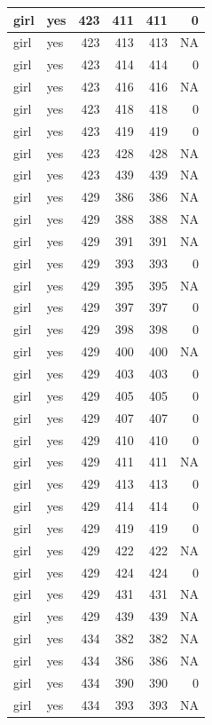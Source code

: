 \documentclass[man]{apa6}
\begin{document}
\begin{tabular}{l|l|r|r|r|r}
\hline
girl & yes & 423 & 411 & 411 & 0\\
\hline
girl & yes & 423 & 413 & 413 & NA\\
\hline
girl & yes & 423 & 414 & 414 & 0\\
\hline
girl & yes & 423 & 416 & 416 & NA\\
\hline
girl & yes & 423 & 418 & 418 & 0\\
\hline
girl & yes & 423 & 419 & 419 & 0\\
\hline
girl & yes & 423 & 428 & 428 & NA\\
\hline
girl & yes & 423 & 439 & 439 & NA\\
\hline
girl & yes & 429 & 386 & 386 & NA\\
\hline
girl & yes & 429 & 388 & 388 & NA\\
\hline
girl & yes & 429 & 391 & 391 & NA\\
\hline
girl & yes & 429 & 393 & 393 & 0\\
\hline
girl & yes & 429 & 395 & 395 & NA\\
\hline
girl & yes & 429 & 397 & 397 & 0\\
\hline
girl & yes & 429 & 398 & 398 & 0\\
\hline
girl & yes & 429 & 400 & 400 & NA\\
\hline
girl & yes & 429 & 403 & 403 & 0\\
\hline
girl & yes & 429 & 405 & 405 & 0\\
\hline
girl & yes & 429 & 407 & 407 & 0\\
\hline
girl & yes & 429 & 410 & 410 & 0\\
\hline
girl & yes & 429 & 411 & 411 & NA\\
\hline
girl & yes & 429 & 413 & 413 & 0\\
\hline
girl & yes & 429 & 414 & 414 & 0\\
\hline
girl & yes & 429 & 419 & 419 & 0\\
\hline
girl & yes & 429 & 422 & 422 & NA\\
\hline
girl & yes & 429 & 424 & 424 & 0\\
\hline
girl & yes & 429 & 431 & 431 & NA\\
\hline
girl & yes & 429 & 439 & 439 & NA\\
\hline
girl & yes & 434 & 382 & 382 & NA\\
\hline
girl & yes & 434 & 386 & 386 & NA\\
\hline
girl & yes & 434 & 390 & 390 & 0\\
\hline
girl & yes & 434 & 393 & 393 & NA\\

\end{tabular}
\end{document}
